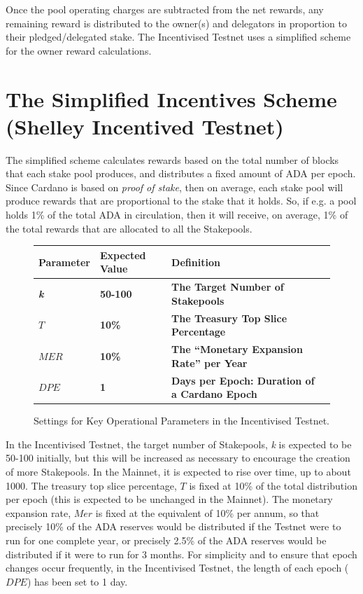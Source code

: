 \documentclass[11pt,a4paper,dvipsnames,twosided,final]{article}
\newcommand{\ada}{ADA{}}
\newcommand{\cardano}[1]{Cardano}
\begin{document}
Once the pool operating charges are subtracted from the net rewards, any remaining reward is distributed to the owner(s) and delegators
in proportion to their pledged/delegated stake.  The Incentivised Testnet uses a simplified scheme for the owner reward calculations.


\clearpage
\section{The Simplified Incentives Scheme (Shelley Incentived Testnet)}
\label{sec:testnet}

The simplified scheme calculates rewards based on the total number of blocks that each stake pool produces,
and distributes a fixed amount of \ada{} per epoch.
Since \cardano{} is based on \emph{proof of stake}, then on average, each stake pool will produce
rewards that are proportional to the stake that it holds.  So, if e.g. a pool holds 1\% of the total
\ada{} in circulation, then it will receive, on average, 1\% of the total rewards that are allocated to all the
Stakepools.

\begin{figure}[h!]
\begin{center}
\begin{tabular}{||l|l|p{10cm}|l||}
  \hline \hline
\textbf{Parameter} & \textbf{Expected Value} & \textbf{Definition} \\\hline
\textbf{\color{green} \emph{k}} & \textbf{\color{green} 50-100} &\textbf{\color{green}  The Target Number of Stakepools} \\\hline
\textbf{\color{green} $T$} & \textbf{\color{green} 10\%} & \textbf{\color{green} The Treasury Top Slice Percentage} \\\hline
\textbf{\color{green} $\textit{MER}$} & \textbf{\color{green} 10\%}&  \textbf{\color{green} The ``Monetary Expansion Rate'' per Year}\\\hline
\textbf{\color{green} $\textit{DPE}$} & \textbf{\color{green} 1} & \textbf{\color{green}  Days per Epoch: Duration of a \cardano{} Epoch} \\\hline
  \hline
\end{tabular}
\end{center}
\caption{Settings for Key Operational Parameters in the Incentivised Testnet.}
\end{figure}

\noindent
In the Incentivised Testnet,
the target number of Stakepools, \emph{k} is expected to be 50-100 initially, but this will be increased as necessary to encourage the creation of more Stakepools.
In the Mainnet, it is expected to rise over time, up to about 1000.
The treasury top slice percentage, $T$ is fixed at 10\% of the total distribution per epoch (this is expected to be unchanged in the Mainnet).
The monetary expansion rate, $\textit{Mer}$ is fixed at the equivalent of 10\% per annum, so that precisely 10\% of the \ada{} reserves would be distributed
if the Testnet were to run for one complete year, or precisely 2.5\% of the \ada{} reserves would be distributed if it were to run for 3 months.
For simplicity and to ensure that epoch changes occur frequently, in the Incentivised Testnet, the length of each epoch ($\textit{DPE}$) has been set to 1 day.
\end{document}
